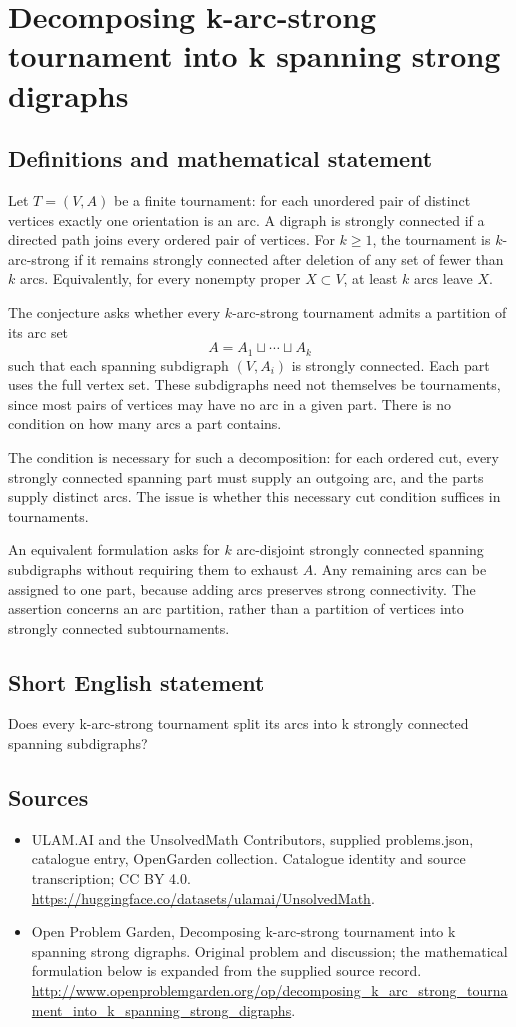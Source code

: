 \documentclass[11pt,a4paper]{article}
\begin{document}
\section*{Decomposing k-arc-strong tournament into k spanning strong digraphs}\label{statement}

\subsection{Definitions and mathematical statement}
Let $T=(V,A)$ be a finite tournament: for each unordered pair of distinct
vertices exactly one orientation is an arc. A digraph is strongly
connected if a directed path joins every ordered pair of vertices.
For $k\ge1$, the tournament is $k$-arc-strong if it remains strongly
connected after deletion of any set of fewer than $k$ arcs. Equivalently,
for every nonempty proper $X\subset V$, at least $k$ arcs leave $X$.

The conjecture asks whether every $k$-arc-strong tournament admits a
partition of its arc set
\[
                      A=A_1\sqcup\cdots\sqcup A_k
\]
such that each spanning subdigraph $(V,A_i)$ is strongly connected.
Each part uses the full vertex set. These subdigraphs need not themselves
be tournaments, since most pairs of vertices may have no arc in a
given part. There is no condition on how many arcs a part contains.

The condition is necessary for such a decomposition: for each ordered
cut, every strongly connected spanning part must supply an outgoing
arc, and the parts supply distinct arcs. The issue is whether this
necessary cut condition suffices in tournaments.

An equivalent formulation asks for $k$ arc-disjoint strongly connected
spanning subdigraphs without requiring them to exhaust $A$. Any remaining
arcs can be assigned to one part, because adding arcs preserves strong
connectivity. The assertion concerns an arc partition, rather than a
partition of vertices into strongly connected subtournaments.
\subsection{Short English statement}
Does every k-arc-strong tournament split its arcs into k strongly connected spanning subdigraphs?
\subsection{Sources}
\begin{itemize}
\item[S1] ULAM.AI and the UnsolvedMath Contributors, supplied problems.json, catalogue entry, OpenGarden collection. Catalogue identity and source transcription; CC BY 4.0.
\url{https://huggingface.co/datasets/ulamai/UnsolvedMath}.
\item[S2] Open Problem Garden, Decomposing k-arc-strong tournament into k spanning strong digraphs. Original problem and discussion; the mathematical formulation below is expanded from the supplied source record.
\url{http://www.openproblemgarden.org/op/decomposing_k_arc_strong_tournament_into_k_spanning_strong_digraphs}.
\end{itemize}
\end{document}
